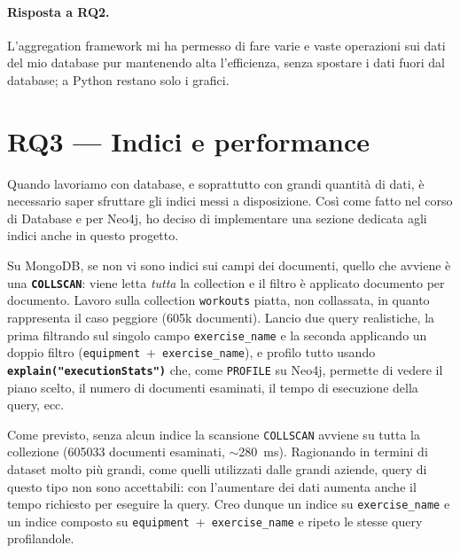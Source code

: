 \documentclass{article}
\begin{document}
\paragraph{Risposta a RQ2.} L'aggregation framework mi ha permesso di fare varie e
vaste operazioni sui dati del mio database pur mantenendo alta l'efficienza, senza
spostare i dati fuori dal database; a Python restano solo i grafici.

\section{RQ3 --- Indici e performance}
\label{sec:rq3}

Quando lavoriamo con database, e soprattutto con grandi quantità di dati, è
necessario saper sfruttare gli indici messi a disposizione. Così come fatto nel
corso di Database e per Neo4j, ho deciso di implementare una sezione dedicata agli
indici anche in questo progetto.

Su MongoDB, se non vi sono indici sui campi dei documenti, quello che avviene è
una \textbf{\texttt{COLLSCAN}}: viene letta \emph{tutta} la collection e il filtro
è applicato documento per documento. Lavoro sulla collection \texttt{workouts}
piatta, non collassata, in quanto rappresenta il caso peggiore (605k documenti).
Lancio due query realistiche, la prima filtrando sul singolo campo
\texttt{exercise\_name} e la seconda applicando un doppio filtro
(\texttt{equipment}~+~\texttt{exercise\_name}), e profilo tutto usando
\textbf{\texttt{explain("executionStats")}} che, come \texttt{PROFILE} su Neo4j,
permette di vedere il piano scelto, il numero di documenti esaminati, il tempo di
esecuzione della query, ecc.

Come previsto, senza alcun indice la scansione \texttt{COLLSCAN} avviene su tutta
la collezione (\num{605033} documenti esaminati, $\sim$280~ms). Ragionando in
termini di dataset molto più grandi, come quelli utilizzati dalle grandi aziende,
query di questo tipo non sono accettabili: con l'aumentare dei dati aumenta anche
il tempo richiesto per eseguire la query. Creo dunque un indice su
\texttt{exercise\_name} e un indice composto su
\texttt{equipment}~+~\texttt{exercise\_name} e ripeto le stesse query profilandole.
\end{document}
